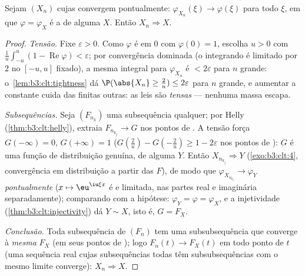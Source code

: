\begin{theorem}
\label{thm:b3:clt:levy}
Sejam $(X_n)$  cujas 
convergem pontualmente: $\varphi_{X_n}(\xi) \to
\varphi(\xi)$ para todo $\xi$, em que $\varphi =
\varphi_X$ é a
 de alguma  $X$. Então
$X_n \Rightarrow X$.
\end{theorem}

\begin{proof}
\emph{Tensão.} Fixe $\varepsilon > 0$. Como $\varphi$ é  em $0$ com $\varphi(0) = 1$,
escolha $u > 0$ com $\frac1u\int_{-u}^u(1 - \operatorname{Re}\varphi) <
\varepsilon$; por convergência dominada (o integrando é
limitado por $2$ no $[-u,u]$ fixado), a mesma integral para $\varphi_{X_n}$
é $< 2\varepsilon$ para $n$ grande: o~\cref{lem:b3:clt:tightness} dá $\P(\abs{X_n} \geq \frac2u)
\leq 2\varepsilon$ para $n$
grande, e aumentar a constante cuida das finitas outras: as leis são
\emph{tensas} --- nenhuma massa escapa.

\emph{Subsequências.} Seja $(F_{n_k})$ uma subsequência qualquer; por Helly
(\cref{thm:b3:clt:helly}), extraia $F_{n_{k_j}} \to G$ nos pontos de . A tensão
força $G(-\infty) = 0$, $G(+\infty) = 1$ ($G(\frac2u) - G(-\frac2u) \geq 1 -
2\varepsilon$ nos pontos de ): $G$ é uma
função de distribuição genuína, de alguma  $Y$.
Então $X_{n_{k_j}} \Rightarrow Y$ (\cref{exo:b3:clt:4}, convergência em distribuição a partir das
$F$), de modo que $\varphi_{X_{n_{k_j}}} \to \varphi_Y$ \emph{pontualmente} ($x
\mapsto \eu^{\iu\xi x}$ é  e
limitada, nas partes real e imaginária separadamente); comparando com a
hipótese: $\varphi_Y = \varphi = \varphi_X$, e a injetividade (\cref{thm:b3:clt:injectivity}) dá $Y \sim X$, isto é,
$G =
F_X$.

\emph{Conclusão.} Toda subsequência de $(F_n)$ tem uma
subsubsequência que converge à \emph{mesma} $F_X$ (em seus pontos de
); logo $F_n(t) \to F_X(t)$ em todo ponto de  $t$ (uma
sequência real cujas subsequências todas têm subsubsequências com o
mesmo limite converge): $X_n \Rightarrow X$.
\end{proof}

